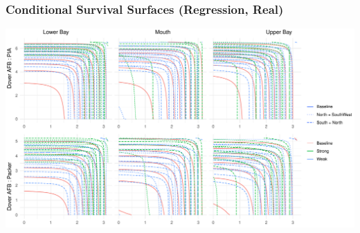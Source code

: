 \documentclass[aspectratio=169,10pt,notes]{beamer}
\newlength{\frametextheight}
\begin{document}
\begin{frame}
    \frametitle{Conditional Survival Surfaces (Regression, Real)}
    \begin{center}
        \includegraphics[height=0.99\frametextheight]{./ch3/plots/condsurv_reg/condsurv_reg_2d_real}
    \end{center}
\end{frame}
\end{document}
